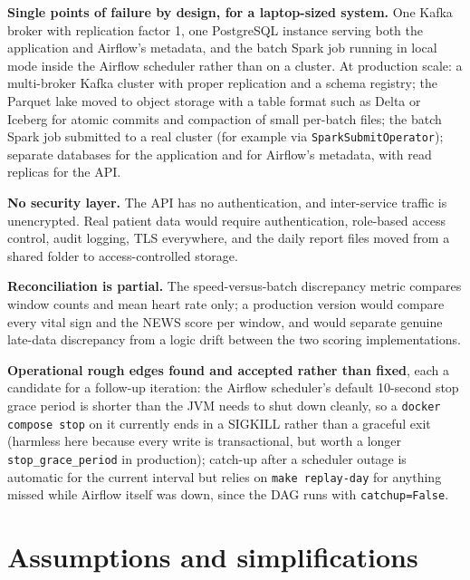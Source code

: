 \documentclass[11pt,a4paper]{article}
\newcommand{\code}[1]{\texttt{\small #1}}
\begin{document}
\textbf{Single points of failure by design, for a laptop-sized system.} One Kafka broker with
replication factor 1, one PostgreSQL instance serving both the application and Airflow's metadata,
and the batch Spark job running in local mode inside the Airflow scheduler rather than on a cluster.
At production scale: a multi-broker Kafka cluster with proper replication and a schema registry; the
Parquet lake moved to object storage with a table format such as Delta or Iceberg for atomic commits
and compaction of small per-batch files; the batch Spark job submitted to a real cluster (for example
via \code{SparkSubmitOperator}); separate databases for the application and for Airflow's metadata,
with read replicas for the API.

\textbf{No security layer.} The API has no authentication, and inter-service traffic is unencrypted.
Real patient data would require authentication, role-based access control, audit logging, TLS
everywhere, and the daily report files moved from a shared folder to access-controlled storage.

\textbf{Reconciliation is partial.} The speed-versus-batch discrepancy metric compares window counts
and mean heart rate only; a production version would compare every vital sign and the NEWS score per
window, and would separate genuine late-data discrepancy from a logic drift between the two scoring
implementations.

\textbf{Operational rough edges found and accepted rather than fixed}, each a candidate for a
follow-up iteration: the Airflow scheduler's default 10-second stop grace period is shorter than the
JVM needs to shut down cleanly, so a \code{docker compose stop} on it currently ends in a SIGKILL
rather than a graceful exit (harmless here because every write is transactional, but worth a longer
\code{stop\_grace\_period} in production); catch-up after a scheduler outage is automatic for the
current interval but relies on \code{make replay-day} for anything missed while Airflow itself was
down, since the DAG runs with \code{catchup=False}.

\section{Assumptions and simplifications}
\label{sec:assumptions}
\end{document}
